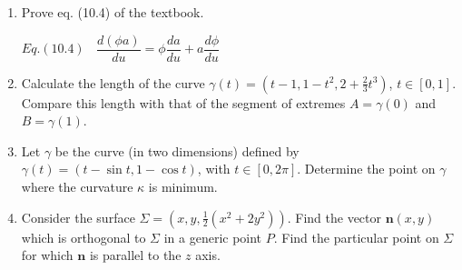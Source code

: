 \documentclass[fleqn]{article}
\begin{document}
\begin{enumerate}
    \item Prove eq. (10.4) of the textbook.
    
      \textcolor{hwColor}{
        $
          Eq. (10.4) ~~~~ \dfrac{d(\phi a)}{du}=\phi \dfrac{da}{du}+a \dfrac{d\phi}{du}
        $
      }
    
    \item Calculate the length of the curve $\gamma(t) =( t-1, 1-t^2, 2 + \frac{2}{3}t^3)$, $t\in[0,1]$.
    Compare this length with that of the segment of extremes $A=\gamma(0)$ and $B=\gamma(1)$.



    \item Let $\gamma$ be the curve (in two dimensions) defined by $\gamma(t)=(t-\sin t, 
    1-\cos t)$, with $t\in[0,2\pi]$.  Determine the point on $\gamma$ where the curvature $\kappa$ is minimum.


    \item Consider the surface $\Sigma=(x,y, \frac{1}{2}(x^2 + 2 y^2))$. Find the vector $\mathbf{n}(x,y)$ which is orthogonal to $\Sigma$ in a generic point $P$.  Find the particular point on $\Sigma$ for which $\mathbf{n}$ is parallel to the $z$ axis. 

  \end{enumerate}
\end{document}
